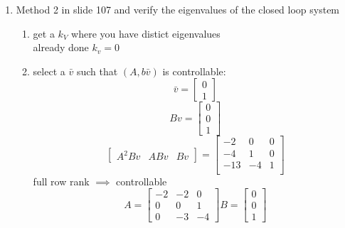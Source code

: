 \begin{enumerate}
\begin{enumerate}
    \end{enumerate}
  \item Method 2 in slide 107 and verify the eigenvalues of the closed loop system\\
    \begin{enumerate}
    \item get a $k_V$ where you have distict eigenvalues\\
      already done $k_v = 0$
    \item select a $\bar v$ such that $(A, b\bar v)$ is controllable:
      \begin{equation}
        \bar v =
        \begin{bmatrix}
          0 \\
          1
        \end{bmatrix}
      \end{equation}
      \begin{equation}
        Bv = \begin{bmatrix}
          0 \\
          0 \\
          1
        \end{bmatrix}
      \end{equation}
      \begin{equation}
        \begin{bmatrix}
          A^2Bv & ABv & Bv
        \end{bmatrix} =
        \begin{bmatrix}
          -2 & 0 & 0 \\
          -4 & 1 & 0 \\
          -13 & -4 & 1 \\
        \end{bmatrix}
      \end{equation}
      full row rank $\implies$ controllable
      \begin{equation}
        A =
        \begin{bmatrix}
          -2 & -2 & 0 \\
          0 & 0 & 1 \\
          0 & -3 & -4 
        \end{bmatrix}
        B =
        \begin{bmatrix}
          0 \\
          0 \\
          1
        \end{bmatrix}
      \end{equation}
      \begin{equation}

\end{equation}
\end{enumerate}
\end{enumerate}
